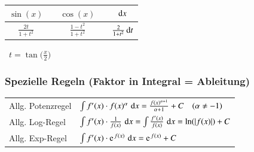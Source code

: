 \begin{minipage}[c]{0.55\columnwidth}

    \begin{tabular}{ c cc cc}
            \toprule
            $\sin(x)$               & & $\cos(x)$                 & & $\mathop{} \! \mathrm{d} x$                     \\
            \midrule
            $\frac{2 t}{1 + t^2}$   & & $\frac{1 - t^2}{1 + t^2}$ & & $\frac{2}{1 + t^2} \mathop{} \! \mathrm{d} t$   \\
            \bottomrule
    \end{tabular}

    \smallskip

    \textrightarrow\ $t = \tan \Big( \frac{x}{2} \Big)$
\end{minipage}
\hfill
\begin{minipage}[c]{0.42\columnwidth}
\end{minipage}

\subsubsection{Spezielle Regeln (Faktor in Integral = Ableitung)}		

\vspace{-0.2cm}

\renewcommand{\arraystretch}{2.3}
\begin{tabular}{ll}
    Allg. Potenzregel   & $\int f'(x) \cdot f(x)^{\alpha} \, \mathop{} \! \mathrm{d} x = \frac{f(x)^{\alpha + 1}}{\alpha + 1} + C \quad   (\alpha \neq -1)$   \\
    Allg. Log-Regel     & $\int f'(x) \cdot \frac{1}{f(x)} \, \mathop{} \! \mathrm{d} x = \int \frac{f'(x)}{f(x)} \, \mathop{} \! \mathrm{d} x = \ln(\vert f(x) \vert ) + C$    \\
    Allg. Exp-Regel     & $\int f'(x) \cdot \e^{f(x)} \, \diff x = \e^{f(x)} + C$
\end{tabular}				
\renewcommand{\arraystretch}{1}


